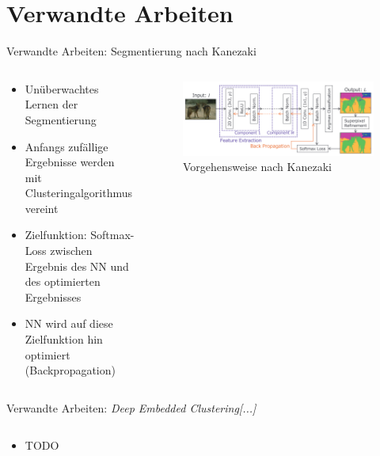 \documentclass[9pt]{beamer}
\begin{document}
\section{Verwandte Arbeiten}

\begin{frame}{Verwandte Arbeiten: Segmentierung nach Kanezaki\cite{kanezaki2018_unsupervised_segmentation}}
\begin{columns}
	\begin{column}{.5\textwidth}
		\begin{itemize}
			\item Unüberwachtes Lernen der Segmentierung
			\item Anfangs zufällige Ergebnisse werden mit Clusteringalgorithmus vereint
			\item Zielfunktion: Softmax-Loss zwischen Ergebnis des NN und des optimierten Ergebnisses
			\item NN wird auf diese Zielfunktion hin optimiert (Backpropagation)
		\end{itemize}
	\end{column}
	\begin{column}{.5\textwidth}
		\begin{figure}
			\includegraphics[width=\textwidth,keepaspectratio]{kanezaki.png}
			\caption{Vorgehensweise nach Kanezaki\cite{kanezaki2018_unsupervised_segmentation}}
		\end{figure}
	\end{column}
\end{columns}
\end{frame}

\begin{frame}{Verwandte Arbeiten: \textit{Deep Embedded Clustering[...]}}
	\begin{columns}
		\begin{column}{.5\textwidth}
			\begin{itemize}
				\item TODO
			\end{itemize}
		\end{column}
		\begin{column}{.5\textwidth}
			\begin{figure}
				
			\end{figure}
		\end{column}
	\end{columns}
\end{frame}
\end{document}
